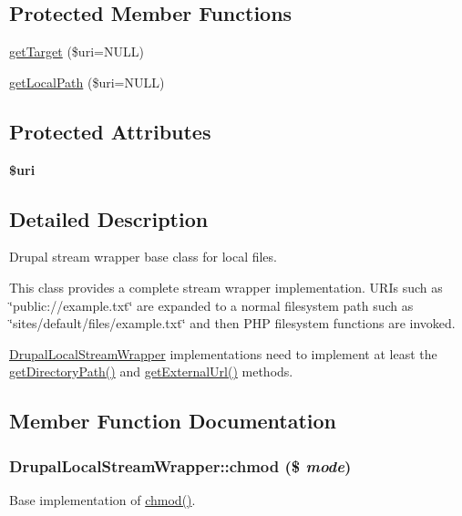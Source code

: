 \subsection*{Protected Member Functions}
\begin{DoxyCompactItemize}
\item 
\hyperlink{classDrupalLocalStreamWrapper_a69cf60b75486daa829b9563ab8a0fa49}{getTarget} (\$uri=NULL)
\item 
\hyperlink{classDrupalLocalStreamWrapper_a68988281b024d7c8ce9e2cf6c1dd1cfa}{getLocalPath} (\$uri=NULL)
\end{DoxyCompactItemize}
\subsection*{Protected Attributes}
\begin{DoxyCompactItemize}
\item 
\hypertarget{classDrupalLocalStreamWrapper_a523e58de993df527e477549aab668abd}{
{\bfseries \$uri}}
\label{classDrupalLocalStreamWrapper_a523e58de993df527e477549aab668abd}

\end{DoxyCompactItemize}


\subsection{Detailed Description}
Drupal stream wrapper base class for local files.

This class provides a complete stream wrapper implementation. URIs such as \char`\"{}public://example.txt\char`\"{} are expanded to a normal filesystem path such as \char`\"{}sites/default/files/example.txt\char`\"{} and then PHP filesystem functions are invoked.

\hyperlink{classDrupalLocalStreamWrapper}{DrupalLocalStreamWrapper} implementations need to implement at least the \hyperlink{classDrupalLocalStreamWrapper_a3ff87a4643479303f4880f2381d0f432}{getDirectoryPath()} and \hyperlink{interfaceDrupalStreamWrapperInterface_af8474357b8c79f1a7629084a05541d16}{getExternalUrl()} methods. 

\subsection{Member Function Documentation}
\hypertarget{classDrupalLocalStreamWrapper_a7ea693783119ad777d54d447bddcee8f}{
\subsubsection[{chmod}]{\setlength{\rightskip}{0pt plus 5cm}DrupalLocalStreamWrapper::chmod (\$ {\em mode})}}
\label{classDrupalLocalStreamWrapper_a7ea693783119ad777d54d447bddcee8f}
Base implementation of \hyperlink{classDrupalLocalStreamWrapper_a7ea693783119ad777d54d447bddcee8f}{chmod()}. 

